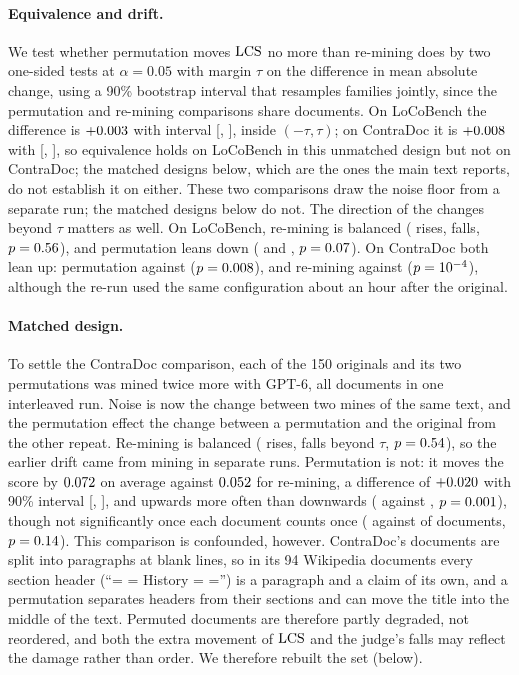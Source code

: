 \paragraph{Equivalence and drift.} We test whether permutation moves $\mathrm{LCS}$ no more than
re-mining does by two one-sided tests at $\alpha=0.05$ with margin $\tau$ on the difference in mean
absolute change, using a 90\% bootstrap interval that resamples families jointly, since the
permutation and re-mining comparisons share documents. On LoCoBench the difference is
$+0.003$ with interval [\extLocoEqLoGpt, \extLocoEqHiGpt], inside $(-\tau,\tau)$; on
ContraDoc it is $+0.008$ with [\extCdEqLoGpt, \extCdEqHiGpt], so equivalence holds on LoCoBench in this unmatched design but not on ContraDoc; the matched designs
below, which are the ones the main text reports, do not establish it on either. These two comparisons draw the noise floor from a
separate run; the matched designs below do not. The direction of the changes beyond
$\tau$ matters as well. On LoCoBench, re-mining is balanced (\extLocoEqNoiseUpGpt{} rises,
\extLocoEqNoiseDownGpt{} falls, $p=0.56$), and permutation leans down
(\extLocoEqPermUpGpt{} and \extLocoEqPermDownGpt, $p=0.07$). On ContraDoc both lean
up: permutation \extCdEqPermUpGpt{} against \extCdEqPermDownGpt{} ($p=0.008$), and
re-mining \extCdEqNoiseUpGpt{} against \extCdEqNoiseDownGpt{} ($p=10^{-4}$), although the
re-run used the same configuration about an hour after the original.

\paragraph{Matched design.} To settle the ContraDoc comparison, each of the 150 originals and its
two permutations was mined twice more with GPT-6, all \extMtRecordsGpt{} documents in one
interleaved run. Noise is now the change between two mines of the same text, and the permutation
effect the change between a permutation and the original from the other repeat. Re-mining is
balanced (\extMtEqNoiseUpGpt{} rises, \extMtEqNoiseDownGpt{} falls beyond $\tau$,
$p=0.54$), so the earlier drift came from mining in separate runs. Permutation is not:
it moves the score by $0.072$ on average against $0.052$ for re-mining, a
difference of $+0.020$ with 90\% interval [\extMtEqLoGpt, \extMtEqHiGpt], and upwards
more often than downwards (\extMtEqPermUpGpt{} against \extMtEqPermDownGpt, $p=0.001$), though not
significantly once each document counts once (\extMtClPermIncGpt{} against \extMtClPermDecGpt{} of
\extMtClPermNGpt{} documents, $p=0.14$).
This comparison is confounded, however. ContraDoc's documents are split into paragraphs at blank
lines, so in its 94 Wikipedia documents every section header (``= = History = ='') is a paragraph and
a claim of its own, and a permutation separates headers from their sections and can move the title
into the middle of the text. Permuted documents are therefore partly degraded, not reordered, and
both the extra movement of $\mathrm{LCS}$ and the judge's falls may reflect the damage rather than order.
We therefore rebuilt the set (below).

